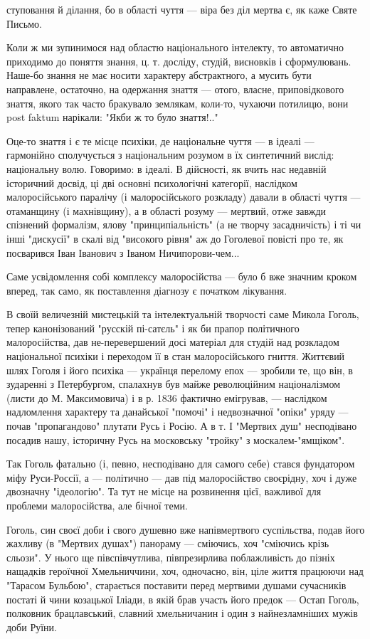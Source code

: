 ступовання й ділання, бо в області чуття — віра без діл мертва є, як каже Святе Письмо.

Коли ж ми зупинимося над областю національного інтелекту, то автоматично приходимо до поняття знання, ц. т. досліду, студій, висновків і сформулювань. Наше-бо знання не має носити характеру абстрактного, а мусить бути направлене, остаточно, на одержання знаття — отого, власне, приповідкового знаття, якого так часто бракувало землякам, коли-то, чухаючи потилицю, вони post faktum нарікали: "Якби ж то було знаття!.."

Оце-то знаття і є те місце психіки, де національне чуття — в ідеалі — гармонійно сполучується з національним розумом в їх синтетичний вислід: національну волю. Говоримо: в ідеалі. В дійсності, як вчить нас недавній історичний досвід, ці дві основні психологічні категорії, наслідком малоросійського паралічу (і малоросійського розкладу) давали в області чуття — отаманщину (і махнівщину), а в області розуму — мертвий, отже завжди спізнений формалізм, ялову "принципіальність" (а не творчу засадничість) і ті чи інші "дискусії" в скалі від "високого рівня" аж до Гоголевої повісті про те, як посварився Іван Іванович з Іваном Ничипорови-чем...

Саме усвідомлення собі комплексу малоросійства — було б вже значним кроком вперед, так само, як поставлення діагнозу є початком лікування.

В своїй величезній мистецькій та інтелектуальній творчості саме Микола Гоголь, тепер канонізований "русскій пі-сатєль" і як би прапор політичного малоросійства, дав не-перевершений досі матеріал для студій над розкладом національної психіки і переходом її в стан малоросійського гниття. Життєвий шлях Гоголя і його психіка — українця перелому епох — зробили те, що він, в зударенні з Петербургом, спалахнув був майже революційним націоналізмом (листи до М. Максимовича) і в р. 1836 фактично емігрував, — наслідком надломлення характеру та данайської "помочі" і недвозначної "опіки" уряду — почав "пропагандово" плутати Русь і Росію. А в т. І "Мертвих душ" несподівано посадив нашу, історичну Русь на московську "тройку" з москалем-"ямщіком".

Так Гоголь фатально (і, певно, несподівано для самого себе) стався фундатором міфу Руси-Россії, а — політично — дав під малоросійство своєрідну, хоч і дуже двозначну "ідеологію". Та тут не місце на розвинення цієї, важливої для проблеми малоросійства, але бічної теми.

Гоголь, син своєї доби і свого душевно вже напівмертвого суспільства, подав його жахливу (в "Мертвих душах") панораму — сміючись, хоч "сміючись крізь сльози". У нього ще півспівчутлива, півпрезирлива поблажливість до пізніх нащадків героїчної Хмельниччини, хоч, одночасно, він, ціле життя працюючи над "Тарасом Бульбою", старається поставити перед мертвими душами сучасників постаті й чини козацької Іліади, в якій брав участь його предок — Остап Гоголь, полковник брацлавський, славний хмельничанин і один з найнезламніших мужів доби Руїни.

